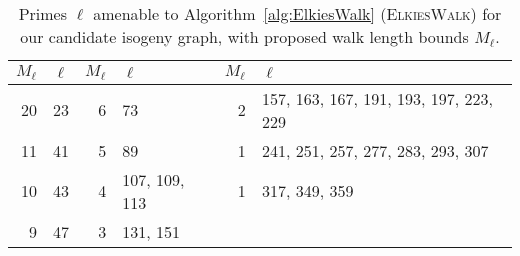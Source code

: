 \documentclass{llncs}
\newcommand{\algstyle}[1]{\textsc{#1}}
\begin{document}
%

\begin{table}
    \centering
    \begin{tabular}{r@{\;}|@{\;}l@{\;}||@{\;}r@{\;}|@{\;}l@{\;}||@{\;}r@{\;}|@{\;}l@{\;}}
        $M_\ell$ & $\ell$
        &
        $M_\ell$ & $\ell$
        &
        $M_\ell$ & $\ell$
        \\
        \hline
        20 & 23
        &
        6  & 73
        &
        2  & 157, 163, 167, 191, 193, 197, 223, 229
        \\
        11 & 41
        &
        5  & 89
        &
        1  & 241, 251, 257, 277, 283, 293, 307
        \\
        10 & 43
        &
        4  & 107, 109, 113
        &
        1  & 317, 349, 359
        \\
        9 & 47
        &
        3  & 131, 151
        & &
      \\
        \hline
    \end{tabular}
    \smallskip
    \caption{Primes $\ell$ amenable to 
        Algorithm~\ref{alg:ElkiesWalk} (\algstyle{ElkiesWalk})
        for our candidate isogeny graph, 
        with proposed walk length bounds $M_\ell$.}
    \label{tab:ElkiesSteps}
\end{table}
\end{document}
